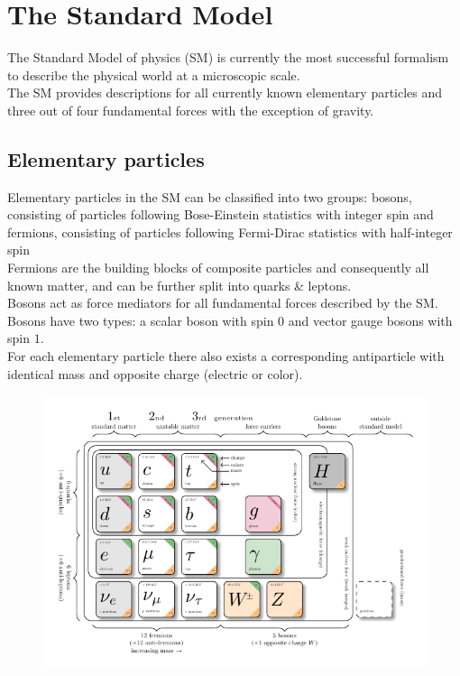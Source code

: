 \documentclass[../thesis.tex]{subfiles}
\begin{document}
\vspace{-1\baselineskip}

\section{The Standard Model}
\label{sec:SM}
The Standard Model of physics (\acs{SM}) is currently the most successful formalism to describe the physical world at a microscopic scale.\\
The \acs{SM} provides descriptions for all currently known elementary particles and three out of four fundamental forces with the exception of gravity.\\

\subsection{Elementary particles}
Elementary particles in the \acs{SM} can be classified into two groups: bosons, consisting of particles following Bose-Einstein statistics with integer spin and fermions, consisting of particles following Fermi-Dirac statistics with half-integer spin\\
Fermions are the building blocks of composite particles and consequently all known matter, and can be further split into quarks \& leptons.\\
Bosons act as force mediators for all fundamental forces described by the \acs{SM}. Bosons have two types: a scalar boson with spin $0$ and vector gauge bosons with spin $1$.\\
For each elementary particle there also exists a corresponding antiparticle with identical mass and opposite charge (electric or color).

\begin{figure}[!htbp]
\begin{center}
\includegraphics[width=\linewidth]{fig/theory_smparticles.pdf}
\caption{\label{fig:smparticles}\citep{theory:smparticles3}}
\end{center}
\end{figure}
\end{document}
